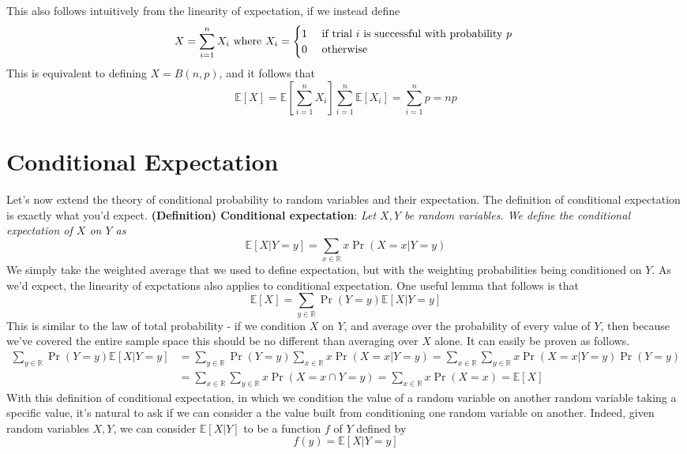 \documentclass{article}
\newcommand*{\tb}{\textbf}
\newcommand*{\ti}{\textit}
\newcommand*{\nn}{\newline \newline}
\newcommand*{\R}{\mathbb{R}}
\newcommand*{\E}{\mathbb{E}}
\begin{document}
This also follows intuitively from the linearity of expectation, if we instead define
$$ X = \sum_{i = 1}^n X_i \text{ where } X_i = \begin{cases}
    1 &\text{ if trial $ i $ is successful with probability $ p $ } \\
    0 &\text{ otherwise }
\end{cases} $$
This is equivalent to defining $ X = B(n, p) $, and it follows that
$$ \E[X] = \E \left[ \sum_{i = 1}^n X_i \right] \sum_{i = 1}^n \E[X_i] = \sum_{i = 1}^n p = n p $$

\section{Conditional Expectation}
Let's now extend the theory of conditional probability to random variables and their expectation. The definition of conditional expectation is exactly what you'd expect.
\nn
\tb{(Definition) Conditional expectation}: \ti{Let $ X, Y $ be random variables. We define the conditional expectation of $ X $ on $ Y $ as}
$$ \E[X | Y = y] = \sum_{x \in \R} x \Pr(X = x | Y = y) $$
We simply take the weighted average that we used to define expectation, but with the weighting probabilities being conditioned on $ Y $. As we'd expect, the linearity of expctations also applies to conditional expectation. One useful lemma that follows is that
$$ \E[X] = \sum_{y \in \R} \Pr(Y = y) \E[X | Y = y] $$
This is similar to the law of total probability - if we condition $ X $ on $ Y $, and average over the probability of every value of $ Y $, then because we've covered the entire sample space this should be no different than averaging over $ X $ alone. It can easily be proven as follows.
$$ \begin{aligned}
    \sum_{y \in \R} \Pr(Y = y) \E[X | Y = y] &= \sum_{y \in \R} \Pr(Y = y) \sum_{x \in \R} x \Pr(X = x | Y = y) = \sum_{x \in \R} \sum_{y \in \R} x \Pr(X = x | Y = y) \Pr(Y = y) \\
    &= \sum_{x \in \R} \sum_{y \in \R} x \Pr(X = x \cap Y = y) = \sum_{x \in \R} x \Pr(X = x) = \E[X] 
\end{aligned} $$
With this definition of conditional expectation, in which we condition the value of a random variable on another random variable taking a specific value, it's natural to ask if we can consider a the value built from conditioning one random variable on another. Indeed, given random variables $ X, Y $, we can consider $ \E[X | Y] $ to be a function $ f $ of $ Y $ defined by
$$ f(y) = \E[X | Y = y] $$
\end{document}
